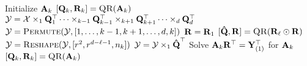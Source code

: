 
\begin{algorithmic}[1]
        \State Initialize $\mathbf{A}_k$
        \State $[\mat{Q}_k,\mat{R}_k] = \Call{QR}{\mat{A}_k}$  \label{l:pair-factor-QR}
      \EndFor
          \State ${\mathbf{\cal{Y}}} =  {\mathbf{\cal{X}}} \times_1 \mathbf{Q}_1^\top \dots \times_{k-1} \mathbf{Q}_{k-1}^\top \times_{k+1} \mathbf{Q}_{k+1}^\top \dots \times_d \mathbf{Q}_d^\top$   \label{l:pairwise-TTM}
          \State $\T{Y} = \Call{Permute}{\T{Y},[1,\dots,k-1,k+1,\dots,d,k]}$  \label{l:pairwise-permute}
          \State $\mathbf{R} = \mathbf{R}_1$
            \State $[\M[\hat]{Q},\mat{R}] = \Call{QR}{\mat{R}_\ell \odot \mat{R}}$  \label{l:pairwise-QR}
            \State $\T{Y}= \Call{Reshape}{\T{Y},[r^2,r^{d-\ell-1},n_k]}$ 
            \State $\T[]{Y} = \T[]{Y} \times_1 \M[\hat]{Q}^\top$  \label{l:pair-R-TTM} 
          \EndFor   
          \State Solve $  \mathbf{A}_k\mathbf{R}^\top = \mathbf{Y}_{(1)}^\top$ for $\mathbf{A}_k$  \label{l:pairwise-solve}
          \State $[\mat{Q}_k,\mat{R}_k] = \Call{QR}{\mat{A}_k}$   \label{l:pairwise-factorQR}
        \EndFor
      \EndWhile
    \EndFunction
  \end{algorithmic}